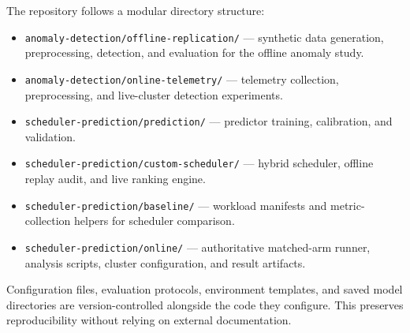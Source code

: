 The repository follows a modular directory structure:

\begin{itemize}
\item \texttt{anomaly-detection/offline-replication/} --- synthetic data generation, preprocessing, detection, and evaluation for the offline anomaly study.
\item \texttt{anomaly-detection/online-telemetry/} --- telemetry collection, preprocessing, and live-cluster detection experiments.
\item \texttt{scheduler-prediction/prediction/} --- predictor training, calibration, and validation.
\item \texttt{scheduler-prediction/custom-scheduler/} --- hybrid scheduler, offline replay audit, and live ranking engine.
\item \texttt{scheduler-prediction/baseline/} --- workload manifests and metric-collection helpers for scheduler comparison.
\item \texttt{scheduler-prediction/online/} --- authoritative matched-arm runner, analysis scripts, cluster configuration, and result artifacts.
\end{itemize}

Configuration files, evaluation protocols, environment templates, and saved model directories are version-controlled alongside the code they configure. This preserves reproducibility without relying on external documentation.

